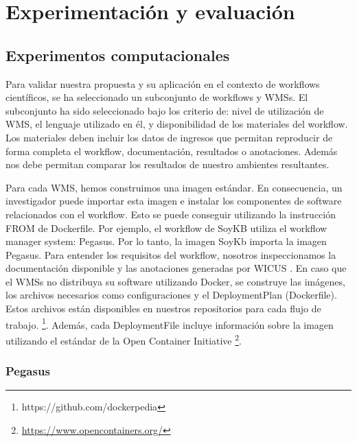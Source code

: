 \chapter{Experimentación y evaluación}
\section{Experimentos computacionales}\label{s5.1}

Para validar nuestra propuesta y su aplicación en el contexto de workflows científicos, se ha seleccionado un subconjunto de workflows y WMSs. 
El subconjunto ha sido seleccionado bajo los criterio de: nivel de utilización de WMS, el lenguaje utilizado en él, y disponibilidad de los materiales del workflow.
Los materiales deben incluir los datos de ingresos que permitan reproducir de forma completa el workflow, documentación, resultados o anotaciones. Además nos debe permitan comparar los resultados de nuestro ambientes resultantes.

Para cada WMS, hemos construimos una imagen estándar. En consecuencia, un investigador puede importar esta imagen e instalar los componentes de software relacionados con el workflow.
Esto se puede conseguir utilizando la instrucción FROM de Dockerfile. Por ejemplo, el workflow de SoyKB utiliza el workflow manager system: Pegasus. Por lo tanto, la imagen SoyKb importa la imagen Pegasus.
Para entender los requisitos del workflow, nosotros inspeccionamos la documentación disponible y las anotaciones generadas por WICUS \cite{santana2017reproducibility}.
En caso que el WMSs no distribuya su software utilizando Docker, se construye las imágenes, los archivos necesarios como configuraciones y el DeploymentPlan (Dockerfile). Estos archivos están disponibles en nuestros repositorios para cada flujo de trabajo. \footnote{https://github.com/dockerpedia}.
Además, cada DeploymentFile incluye información sobre la imagen utilizando el estándar de la Open Container Initiative \footnote{\url{https://www.opencontainers.org/}}. 

\subsection{Pegasus}

